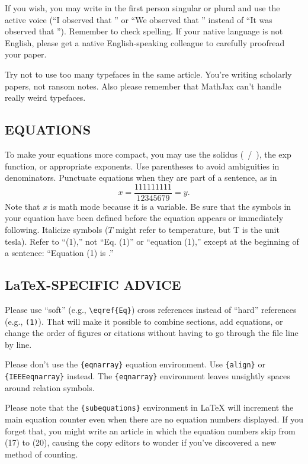 \documentclass{IEEEoj-data}
\begin{document}
{If you wish, you may write in the first person singular or plural and use 
the active voice (``I observed that \textellipsis'' or ``We observed that \textellipsis'' 
instead of ``It was observed that \textellipsis''). Remember to check spelling. If 
your native language is not English, please get a native English-speaking 
colleague to carefully proofread your paper.

Try not to use too many typefaces in the same article. You're writing
scholarly papers, not ransom notes. Also please remember that MathJax
can't handle really weird typefaces.

\subsection*{EQUATIONS}
To make your equations more 
compact, you may use the solidus (~/~), the exp function, or appropriate 
exponents. Use parentheses to avoid ambiguities in denominators. Punctuate 
equations when they are part of a sentence, as in
\begin{equation}
\label{eq1}
x=\frac{111111111}{12345679}=y .
\end{equation}
Note that $x$ is math mode because it is a variable. 
Be sure that the symbols in your equation have been defined before the 
equation appears or immediately following. Italicize symbols ($T$ might refer 
to temperature, but T is the unit tesla). Refer to ``(1),'' not ``Eq. (1)'' 
or ``equation (1),'' except at the beginning of a sentence: ``Equation (1) 
is \textellipsis .''

\subsection*{\LaTeX-SPECIFIC ADVICE}

Please use ``soft'' (e.g., \verb|\eqref{Eq}|) cross references instead
of ``hard'' references (e.g., \verb|(1)|). That will make it possible
to combine sections, add equations, or change the order of figures or
citations without having to go through the file line by line.

Please don't use the \verb|{eqnarray}| equation environment. Use
\verb|{align}| or \verb|{IEEEeqnarray}| instead. The \verb|{eqnarray}|
environment leaves unsightly spaces around relation symbols.

Please note that the \verb|{subequations}| environment in {\LaTeX}
will increment the main equation counter even when there are no
equation numbers displayed. If you forget that, you might write an
article in which the equation numbers skip from (17) to (20), causing
the copy editors to wonder if you've discovered a new method of
counting.

}
\end{document}
